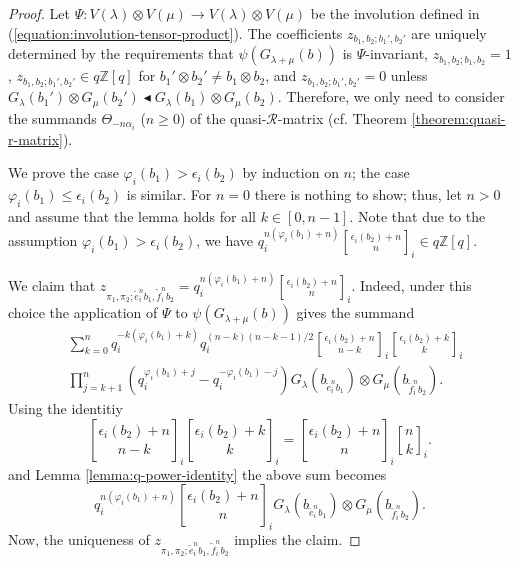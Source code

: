 \documentclass[final]{amsart}
\theoremstyle{plain}
\theoremstyle{definition}
\newcommand{\qbinom}{\genfrac{[}{]}{0pt}{}}
\newcommand{\calR}{\mathcal R}
\newcommand{\bbZ}{\mathbb Z}
\newcommand{\te}{\tilde e}
\newcommand{\tf}{\tilde f}
\begin{document}
\begin{proof}
    Let $\Psi\colon V(\lambda) \otimes V(\mu) \to V(\lambda) \otimes V(\mu)$ be the involution defined in (\ref{equation:involution-tensor-product}).
    The coefficients $z_{b_1,b_2;b_1',b_2'}$ are uniquely determined by the requirements that $\psi(G_{\lambda+\mu}(b))$ is $\Psi$-invariant, $z_{b_1,b_2;b_1,b_2} = 1$, $z_{b_1,b_2;b_1',b_2'} \in q\bbZ[q]$ for $b_1' \otimes b_2' \neq b_1 \otimes b_2$, and $z_{b_1,b_2;b_1',b_2'} = 0$ unless $G_\lambda(b_1') \otimes G_\mu(b_2') \blacktriangleleft G_\lambda(b_1)\otimes G_\mu(b_2)$.
    Therefore, we only need to consider the summands $\Theta_{-n\alpha_i}$ ($n \ge 0$) of the quasi-$\calR$-matrix (cf. Theorem \ref{theorem:quasi-r-matrix}).

    We prove the case $\varphi_i(b_1) > \epsilon_i(b_2)$ by induction on $n$; the case $\varphi_i(b_1) \le \epsilon_i(b_2)$ is similar.
    For $n = 0$ there is nothing to show; thus, let $n > 0$ and assume that the lemma holds for all $k \in [0, n-1]$.
    Note that due to the assumption $\varphi_i(b_1) > \epsilon_i(b_2)$, we have $q_i^{n(\varphi_i(b_1)+n)} \qbinom{\epsilon_i(b_2)+n}{n}_i \in q\bbZ[q]$.

    We claim that $z_{\pi_1,\pi_2;\te_i^n b_1,\tf_i^n b_2} = q_i^{n(\varphi_i(b_1)+n)} \qbinom{\epsilon_i(b_2)+n}{n}_i$.
    Indeed, under this choice the application of $\Psi$ to $\psi(G_{\lambda+\mu}(b))$ gives the summand
    \begin{align*}
        & \sum_{k=0}^n q_i^{-k(\varphi_i(b_1)+k)} q_i^{(n-k)(n-k-1)/2} \qbinom{\epsilon_i(b_2)+n}{n-k}_i \qbinom{\epsilon_i(b_2)+k}{k}_i \\
        & \prod_{j=k+1}^n (q_i^{\varphi_i(b_1)+j} - q_i^{-\varphi_i(b_1)-j}) G_\lambda(b_{\te_i^n b_1}) \otimes G_\mu(b_{\tf_i^n b_2}).
    \end{align*}
    Using the identitiy
    \[
        \qbinom{\epsilon_i(b_2)+n}{n-k}_i \qbinom{\epsilon_i(b_2)+k}{k}_i = \qbinom{\epsilon_i(b_2)+n}{n}_i \qbinom{n}{k}_i.
    \]
    and Lemma \ref{lemma:q-power-identity} the above sum becomes
    \[
        q_i^{n(\varphi_i(b_1)+n)} \qbinom{\epsilon_i(b_2)+n}{n}_i G_\lambda(b_{\te_i^n b_1}) \otimes G_\mu(b_{\tf_i^n b_2}).
    \]
    Now, the uniqueness of $z_{\pi_1,\pi_2;\te_i^n b_1,\tf_i^n b_2}$ implies the claim.
\end{proof}
\end{document}
